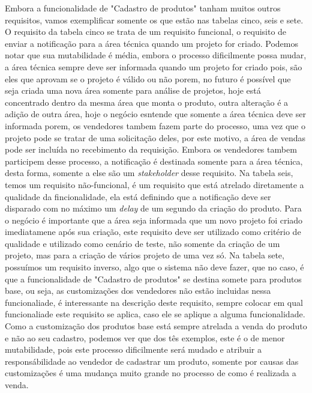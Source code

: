     Embora a funcionalidade de "Cadastro de produtos" tanham muitos outros requisitos,
    vamos exemplificar somente os que estão nas tabelas cinco, seis e sete.
    O requisito da tabela cinco se trata de um requisito funcional, o requisito de
    enviar a notificação para a área técnica quando um projeto for criado. Podemos
    notar que sua mutabilidade é média, embora o processo dificilmente possa mudar,
    a área técnica sempre deve ser informada quando um projeto for criado pois,
    são eles que aprovam se o projeto é válido ou não porem, no futuro é possível
    que seja criada uma nova área somente para análise de projetos, hoje está
    concentrado dentro da mesma área que monta o produto, outra alteração é a
    adição de outra área, hoje o negócio esntende que somente a área técnica deve
    ser informada porem, os vendedores tambem fazem parte do processo, uma vez que
    o projeto pode se tratar de uma solicitação deles, por este motivo, a área de
    vendas pode ser incluída no recebimento da requisição. Embora os vendedores
    tambem participem desse processo, a notificação é destinada somente para a área
    técnica, desta forma, somente a else são um \textit{stakeholder} desse
    requisito. Na tabela seis, temos um requisito não-funcional, é um requisito
    que está atrelado diretamente a qualidade da fincionalidade, ela está definindo
    que a notificação deve ser disparado com no máximo um \textit{delay} de um
    segundo da criação do produto. Para o negócio é importante que a área seja
    informada que um novo projeto foi criado imediatamene após sua criação, este
    requisito deve ser utilizado como critério de qualidade e utilizado como cenário
    de teste, não somente da criação de um projeto, mas para a criação de vários
    projeto de uma vez só. Na tabela sete, possuímos um requisito inverso, algo
    que o sistema não deve fazer, que no caso, é que a funcionalidade de "Cadastro
    de produtos" se destina somete para produtos base, ou seja, as customizações
    dos vendedores não estão incluidas nessa funcionaliade, é interessante na
    descrição deste requisito, sempre colocar em qual funcionaliade este requisito
    se aplica, caso ele se aplique a alguma funcionalidade. Como a customização
    dos produtos base está sempre atrelada a venda do produto e não ao seu
    cadastro, podemos ver que dos tês exemplos, este é o de menor mutabilidade,
    pois este processo dificilmente será mudado e atribuir a responsábilidade ao
    vendedor de cadastrar um produto, somente por causas das customizações é uma
    mudança muito grande no processo de como é realizada a venda.

